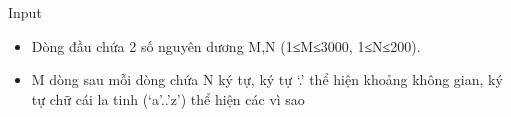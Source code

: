 Input
\begin{itemize}
	\item Dòng đầu chứa 2 số nguyên dương M,N (1≤M≤3000, 1≤N≤200).
	\item M dòng sau mỗi dòng chứa N ký tự, ký tự ‘.’ thể hiện khoảng không gian, ký tự chữ cái la tinh (‘a’..’z’) thể hiện các vì sao
\end{itemize}
